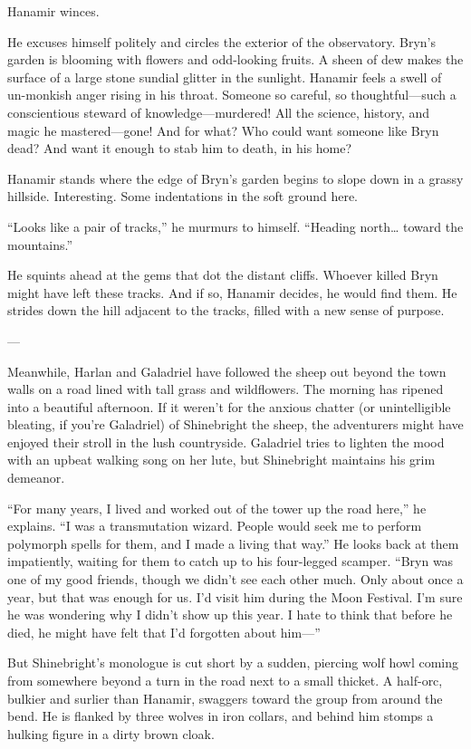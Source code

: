\documentclass[smalldemyvopaper,11pt,twoside,onecolumn,openright,extrafontsizes]{memoir}
\begin{document}
Hanamir winces.

He excuses himself politely and circles the exterior of the observatory.
Bryn's garden is blooming with flowers and odd-looking fruits. A sheen
of dew makes the surface of a large stone sundial glitter in the
sunlight. Hanamir feels a swell of un-monkish anger rising in his
throat. Someone so careful, so thoughtful---such a conscientious steward
of knowledge---murdered! All the science, history, and magic he
mastered---gone! And for what? Who could want someone like Bryn dead?
And want it enough to stab him to death, in his home?

Hanamir stands where the edge of Bryn's garden begins to slope down in a
grassy hillside. Interesting. Some indentations in the soft ground here.

``Looks like a pair of tracks,'' he murmurs to himself. ``Heading
north\ldots{} toward the mountains.''

He squints ahead at the gems that dot the distant cliffs. Whoever killed
Bryn might have left these tracks. And if so, Hanamir decides, he would
find them. He strides down the hill adjacent to the tracks, filled with
a new sense of purpose.

---

Meanwhile, Harlan and Galadriel have followed the sheep out beyond the
town walls on a road lined with tall grass and wildflowers. The morning
has ripened into a beautiful afternoon. If it weren't for the anxious
chatter (or unintelligible bleating, if you're Galadriel) of Shinebright
the sheep, the adventurers might have enjoyed their stroll in the lush
countryside. Galadriel tries to lighten the mood with an upbeat walking
song on her lute, but Shinebright maintains his grim demeanor.

``For many years, I lived and worked out of the tower up the road
here,'' he explains. ``I was a transmutation wizard. People would seek
me to perform polymorph spells for them, and I made a living that way.''
He looks back at them impatiently, waiting for them to catch up to his
four-legged scamper. ``Bryn was one of my good friends, though we didn't
see each other much. Only about once a year, but that was enough for us.
I'd visit him during the Moon Festival. I'm sure he was wondering why I
didn't show up this year. I hate to think that before he died, he might
have felt that I'd forgotten about him---''

But Shinebright's monologue is cut short by a sudden, piercing wolf howl
coming from somewhere beyond a turn in the road next to a small thicket.
A half-orc, bulkier and surlier than Hanamir, swaggers toward the group
from around the bend. He is flanked by three wolves in iron collars, and
behind him stomps a hulking figure in a dirty brown cloak.
\end{document}
